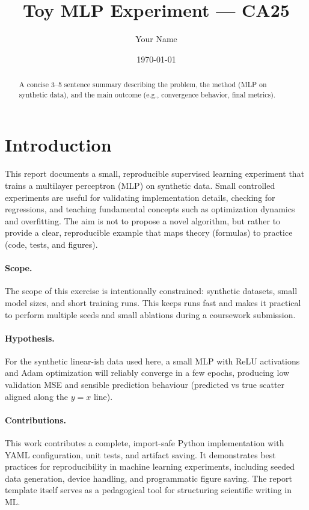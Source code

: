 \documentclass[11pt]{article}
\title{Toy MLP Experiment — CA25}
\author{Your Name}
\date{\today}
\begin{document}
\maketitle

\begin{abstract}
A concise 3–5 sentence summary describing the problem, the method (MLP on synthetic data), and the main outcome (e.g., convergence behavior, final metrics).
\end{abstract}

\section{Introduction}
This report documents a small, reproducible supervised learning experiment that trains a multilayer perceptron (MLP) on synthetic data. Small controlled experiments are useful for validating implementation details, checking for regressions, and teaching fundamental concepts such as optimization dynamics and overfitting. The aim is not to propose a novel algorithm, but rather to provide a clear, reproducible example that maps theory (formulas) to practice (code, tests, and figures).

\paragraph{Scope.} The scope of this exercise is intentionally constrained: synthetic datasets, small model sizes, and short training runs. This keeps runs fast and makes it practical to perform multiple seeds and small ablations during a coursework submission.

\paragraph{Hypothesis.} For the synthetic linear-ish data used here, a small MLP with ReLU activations and Adam optimization will reliably converge in a few epochs, producing low validation MSE and sensible prediction behaviour (predicted vs true scatter aligned along the $y=x$ line).

\paragraph{Contributions.} This work contributes a complete, import-safe Python implementation with YAML configuration, unit tests, and artifact saving. It demonstrates best practices for reproducibility in machine learning experiments, including seeded data generation, device handling, and programmatic figure saving. The report template itself serves as a pedagogical tool for structuring scientific writing in ML.
\end{document}
